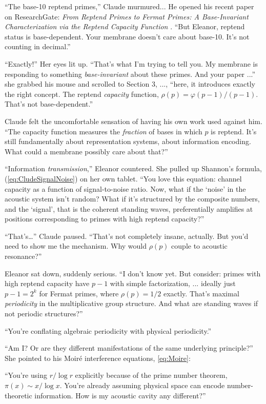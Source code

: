 ``The base-10 reptend primes,'' Claude murmured... He opened his recent paper on ResearchGate: \emph{From Reptend Primes to Fermat Primes: A Base-Invariant Characterization via the Reptend Capacity Function} \cite{mcculloch2025reptend}. ``But Eleanor, reptend status is base-dependent. Your membrane doesn't care about base-10. It's not counting in decimal.''

``Exactly!'' Her eyes lit up. ``That's what I'm trying to tell you. My membrane is responding to something \emph{base-invariant} about these primes. And your paper ...'' she grabbed his mouse and scrolled to Section 3, ..., ``here, it introduces exactly the right concept. The reptend \emph{capacity} function, $\rho(p) = \varphi(p-1)/(p-1)$. That's not base-dependent.''

Claude felt the uncomfortable sensation of having his own work used against him. ``The capacity function measures the \emph{fraction} of bases in which $p$ is reptend. It's still fundamentally about representation systems, about information encoding. What could a membrane possibly care about that?''

``Information \emph{transmission},'' Eleanor countered. She pulled up Shannon's formula, (\ref{eq:CludeSignalNoise}) on her own tablet. ``You love this equation: channel capacity as a function of signal-to-noise ratio. Now, what if the `noise' in the acoustic system isn't random? What if it's structured by the composite numbers, and the `signal', that is the coherent standing waves, preferentially amplifies at positions corresponding to primes with high reptend capacity?''

``That's\ldots'' Claude paused. ``That's not completely insane, actually. But you'd need to show me the mechanism. Why would $\rho(p)$ couple to acoustic resonance?''

Eleanor sat down, suddenly serious. ``I don't know yet. But consider: primes with high reptend capacity have $p-1$ with simple factorization, ... ideally just $p-1 = 2^k$ for Fermat primes, where $\rho(p) = 1/2$ exactly. That's maximal \emph{periodicity} in the multiplicative group structure. And what are standing waves if not periodic structures?''

``You're conflating algebraic periodicity with physical periodicity.''

``Am I? Or are they different manifestations of the same underlying principle?'' She pointed to his Moiré interference equations, \ref{eq:Moire}:

``You're using $r/\log r$ explicitly because of the prime number theorem, $\pi(x) \sim x/\log x$. You're already assuming physical space can encode number-theoretic information. How is my acoustic cavity any different?''

